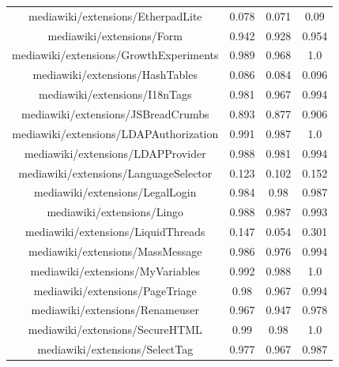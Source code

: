 \begin{table}[H]
\begin{tabular}{@{}c c c c@{}}
mediawiki/extensions/EtherpadLite & 0.078 & 0.071 & 0.09 \\
mediawiki/extensions/Form & 0.942 & 0.928 & 0.954 \\
mediawiki/extensions/GrowthExperiments & 0.989 & 0.968 & 1.0 \\
mediawiki/extensions/HashTables & 0.086 & 0.084 & 0.096 \\
mediawiki/extensions/I18nTags & 0.981 & 0.967 & 0.994 \\
mediawiki/extensions/JSBreadCrumbs & 0.893 & 0.877 & 0.906 \\
mediawiki/extensions/LDAPAuthorization & 0.991 & 0.987 & 1.0 \\
mediawiki/extensions/LDAPProvider & 0.988 & 0.981 & 0.994 \\
mediawiki/extensions/LanguageSelector & 0.123 & 0.102 & 0.152 \\
mediawiki/extensions/LegalLogin & 0.984 & 0.98 & 0.987 \\
mediawiki/extensions/Lingo & 0.988 & 0.987 & 0.993 \\
mediawiki/extensions/LiquidThreads & 0.147 & 0.054 & 0.301 \\
mediawiki/extensions/MassMessage & 0.986 & 0.976 & 0.994 \\
mediawiki/extensions/MyVariables & 0.992 & 0.988 & 1.0 \\
mediawiki/extensions/PageTriage & 0.98 & 0.967 & 0.994 \\
mediawiki/extensions/Renameuser & 0.967 & 0.947 & 0.978 \\
mediawiki/extensions/SecureHTML & 0.99 & 0.98 & 1.0 \\
mediawiki/extensions/SelectTag & 0.977 & 0.967 & 0.987 \\
    \hline
\end{tabular}
    \label{table:accuracy-score-merged-appendix-c-part-1}
\end{table}

